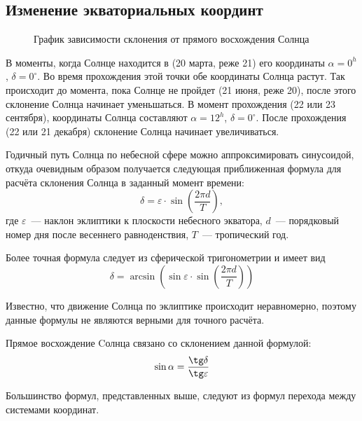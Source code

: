 \subsection{Изменение экваториальных координт}
\begin{wrapfigure}[12]{r}{0.5\tw}
	\centering
	\vspace{-.7pc}
 	\caption{График зависимости склонения от прямого восхождения Солнца}
\end{wrapfigure}
В моменты, когда Солнце находится в   (20 марта, реже 21) его координаты $\alpha=0^h$, $\delta=0^{\circ}$. Во время прохождения этой точки обе координаты Солнца растут. Так происходит до момента, пока Солнце не пройдет  (21 июня, реже 20), после этого склонение Солнца начинает уменьшаться. В момент прохождения  (22 или 23 сентября), координаты Солнца составляют $\alpha=12^h$, $\delta=0^{\circ}$. После прохождения  (22 или 21 декабря) склонение Солнца начинает увеличиваться.

Годичный путь Солнца по небесной сфере можно аппроксимировать синусоидой, откуда очевидным образом получается следующая приближенная формула для расчёта склонения Солнца в заданный момент времени:
\begin{equation}
\delta=\varepsilon\cdot\sin \left(\frac{2 \pi d}{T}\right),
\end{equation}
где $\varepsilon$~--- наклон эклиптики к плоскости небесного экватора, $d$~--- порядковый номер дня после весеннего равноденствия, $T$~--- тропический год.

Более точная формула следует из сферической тригонометрии и имеет вид
\begin{equation}
\delta=\arcsin\left(\sin\varepsilon\cdot\sin \left(\frac{2 \pi d}{T}\right)\right)
\end{equation}

Известно, что движение Солнца по эклиптике происходит неравномерно, поэтому данные формулы не являются верными для точного расчёта.

Прямое восхождение Cолнца связано со склонением данной формулой:
\begin{equation}
\sin\alpha=\frac{\tg\delta}{\tg\varepsilon}
\end{equation}

Большинство формул, представленных выше, следуют из формул перехода между системами координат. 
